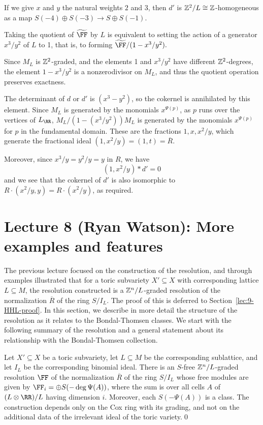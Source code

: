 \documentclass{amsart}
\begin{document}
\begin{example} 
If we give $x$ and $y$ the natural weights $2$ and 3, then $d'$ is $\mathbb Z^2/L \cong \mathbb Z$-homogeneous as a map $S(-4) \oplus S(-3) \to S\oplus S(-1)$.

Taking the quotient of $\tF$ by $L$ is equivalent to setting the action of a generator $x^{3}/y^{2}$ of $L$ to 1, that
is, to forming $\tF/(1-x^{3}/y^{2}).$

Since $M_L$ is $\mathbb Z^{2}$-graded, and the elements 1 and $x^{3}/y^{2}$ have
different $\mathbb Z^{2}$-degrees, the element $1-x^{3}/y^{2}$ is a nonzerodivisor on $M_L$, and thus
the quotient operation preserves exactness.

The determinant of $d$ or $d'$ is 
$(x^3-y^2)$, so the cokernel is annihilated by this element.
Since $M_L$ is generated by
the monomials $x^{\Psi(p)}$, as $p$ runs over the vertices of $L_\RR$, $M_L/(1-(x^3/y^2))M_L$
is generated by the monomials $x^{\Psi(p)}$ for $p$ in the fundamental domain. 
These are the fractions $1,x,x^2/y$, which generate
the fractional ideal $(1, x^2/y) = (1,t)  = \overline R$.

Moreover, since $x^3/y = y^2/y = y$ in $R$, we have
$$
(1, x^2/y)*d' = 0
$$
and we see that the cokernel of $d'$ is also isomorphic to 
$R\cdot(x^2/y, y) = R\cdot (x^2/y)$, as required.
\end{example}


\section{Lecture 8 (Ryan Watson): More examples and features}\label{lec:8-HHL-examples}

The previous lecture focused on the construction of the resolution, and through examples illustrated that for a toric subvariety $X'\subseteq X$ with corresponding lattice $L\subseteq M$, the resolution constructed is a $\mathbb Z^{n}/L$-graded resolution of the normalization $\overline{R}$ of the ring $S/I_L$. The proof of this is deferred to Section~\ref{lec:9-HHL-proof}. In this section, we describe in more detail the structure of the resolution as it relates to the Bondal-Thomsen classes. We start with the following summary of the resolution and a general statement about its relationship with the Bondal-Thomsen collection.

\begin{cor}
  \label{cor:hhlSummandsBT}
  Let $X'\subseteq X$ be a toric subvariety,  let $L\subseteq M$ be the corresponding sublattice, and let $I_{L}$ be the corresponding binomial ideal. There is an $S$-free $\mathbb Z^{n}/L$-graded resolution $\FF$ of the
  normalization $\overline R$ of the ring $S/I_{L}$ whose free modules are given by $\FF_{i} = \oplus S(-\deg\Psi(A))$, where the sum is over all cells $A$ of $(L \otimes \RR)/L$ having dimension $i$. Moreover, each $S(-\Psi(A))$ is a \BT class. 
  The construction depends only on the Cox ring with its grading, and not on the additional data of the
  irrelevant ideal of the toric variety.\qed
\end{cor}
\end{document}
